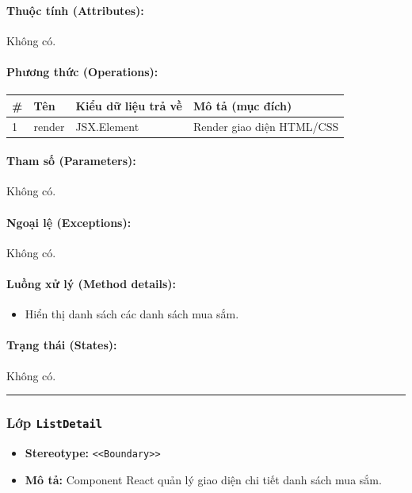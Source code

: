\documentclass[12pt,a4paper]{article}
\begin{document}
\paragraph{Thuộc tính (Attributes):}
Không có.

\paragraph{Phương thức (Operations):}
\begin{longtable}{|p{0.6cm}|p{5.0cm}|p{2.8cm}|p{5.4cm}|}
\hline
\textbf{\#} & \textbf{Tên} & \textbf{Kiểu dữ liệu trả về} & \textbf{Mô tả (mục đích)} \\ \hline
\endhead
1 & render & JSX.Element & Render giao diện HTML/CSS \\ \hline
\end{longtable}

\paragraph{Tham số (Parameters):}
Không có.

\paragraph{Ngoại lệ (Exceptions):}
Không có.

\paragraph{Luồng xử lý (Method details):}
\begin{itemize}[leftmargin=*]
    \item Hiển thị danh sách các danh sách mua sắm.
\end{itemize}


\paragraph{Trạng thái (States):}
Không có.

\vskip 0.5cm
\noindent\rule{\textwidth}{0.5pt}
\vskip 0.5cm

\subsubsection{Lớp \texttt{ListDetail}}

\begin{itemize}[leftmargin=*]
    \item \textbf{Stereotype:} \texttt{\textless{}\textless{}Boundary\textgreater{}\textgreater{}}
    \item \textbf{Mô tả:} Component React quản lý giao diện chi tiết danh sách mua sắm.
\end{itemize}
\end{document}
